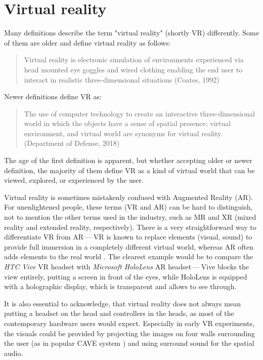 \chapter{Virtual reality}

Many definitions describe the term "virtual reality" (shortly VR) differently.
Some of them are older and define virtual reality as follows:

\begin{quotation}
Virtual reality is electronic simulation of environments experienced via
head mounted eye goggles and wired clothing enabling the end user to interact
in realistic three-dimensional situations (Coates, 1992)
\end{quotation}

Newer definitions define VR as:


\begin{quotation}
The use of computer technology to create an interactive three-dimensional
world in which the objects have a sense of spatial presence;
virtual environment, and virtual world are synonyms for virtual reality.
(Department of Defense, 2018)
\end{quotation}

The age of the first definition is apparent, but whether accepting older or newer
definition, the majority of them define VR as a kind of
virtual world that can be viewed, explored, or experienced by the user.


Virtual reality is sometimes mistakenly confused with Augmented Reality (AR).
For unenlightened people, these terms (VR and AR) can be hard to distinguish,
not to mention the other terms used in the industry, such as MR and XR
(mixed reality and extended reality, respectively). There is a very straightforward
way to differentiate VR from AR — VR is known to replace elements
(visual, sound) to provide full immersion in a completely different virtual
world, whereas AR often adds elements to the real world \hyperlink{vrar}{}.
The clearest example would be to compare the \emph{HTC Vive} VR headset with
\emph{Microsoft HoloLens} AR headset — Vive blocks the view entirely, putting
a screen in front of the eyes, while HoloLens is equipped with a holographic
display, which is transparent and allows to see through.


It is also essential to acknowledge, that virtual reality does not always mean
putting a headset on the head and controllers in the heads, as most of the
contemporary hardware users would expect. Especially in
early VR experiments, the visuals could be provided by projecting the images
on four walls surrounding the user (as in popular CAVE system \hyperlink{cave}{}) and
using surround sound for the spatial audio.


